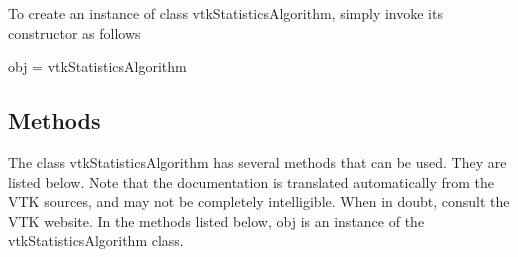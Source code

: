 To create an instance of class vtk\-Statistics\-Algorithm, simply invoke its constructor as follows \begin{DoxyVerb}  obj = vtkStatisticsAlgorithm
\end{DoxyVerb}
 \hypertarget{vtkwidgets_vtkxyplotwidget_Methods}{}\subsection{Methods}\label{vtkwidgets_vtkxyplotwidget_Methods}
The class vtk\-Statistics\-Algorithm has several methods that can be used. They are listed below. Note that the documentation is translated automatically from the V\-T\-K sources, and may not be completely intelligible. When in doubt, consult the V\-T\-K website. In the methods listed below, {\ttfamily obj} is an instance of the vtk\-Statistics\-Algorithm class. 

